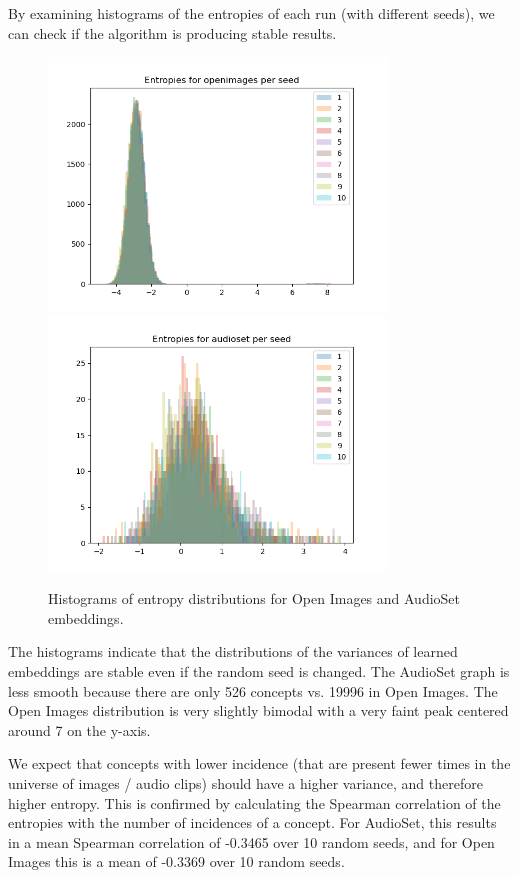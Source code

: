 By examining histograms of the entropies of each run (with different seeds), we can check if the algorithm is producing stable results. 
\begin{figure}[H]
\label{fig:entropyindependent}
    \centering
    \includegraphics[width=0.8\textwidth]{images/method/probabilistic_independent/openimages_entropies.png}
    \includegraphics[width=0.8\textwidth]{images/method/probabilistic_independent/audioset_entropies.png}
    \caption{
        Histograms of entropy distributions for Open Images and AudioSet embeddings. 
    }
\end{figure}
 
The histograms indicate that the distributions of the variances of learned embeddings are stable even if the random seed is changed. The AudioSet graph is less smooth because there are only 526 concepts vs. 19996 in Open Images. The Open Images distribution is very slightly bimodal with a very faint peak centered around 7 on the y-axis. 
 
We expect that concepts with lower incidence (that are present fewer times in the universe of images / audio clips) should have a higher variance, and therefore higher entropy. This is confirmed by calculating the Spearman correlation of the entropies with the number of incidences of a concept. For AudioSet, this results in a mean Spearman correlation of -0.3465 over 10 random seeds, and for Open Images this is a mean of -0.3369 over 10 random seeds. 

